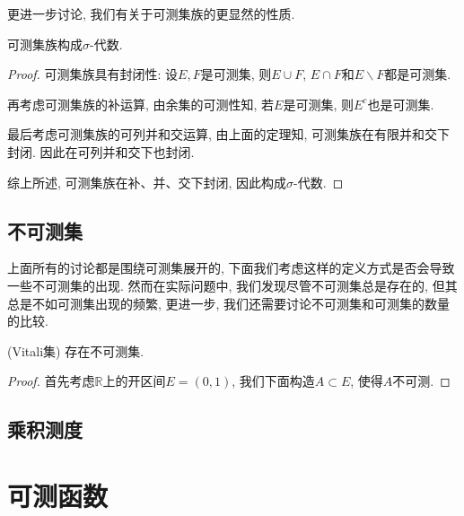 \documentclass[theorem=false,mathfont=none,openany,sub3section]{easybook}
\newcommand{\btocgroup}[1][toc]{\addtocontents{#1}{\string\begingroup}}
\newcommand{\etocgroup}[1][toc]{\addtocontents{#1}{\string\endgroup}}
\begin{document}
更进一步讨论, 我们有关于可测集族的更显然的性质.\par

\begin{theorem}
  可测集族构成$\sigma$-代数.\par
\end{theorem}

\begin{proof}
  可测集族具有封闭性: 设$E,F$是可测集, 则$E\cup F$, $E\cap F$和$E\backslash F$都是可测集.\par
  再考虑可测集族的补运算, 由余集的可测性知, 若$E$是可测集, 则$E^c$也是可测集.\par
  最后考虑可测集族的可列并和交运算, 由上面的定理知, 可测集族在有限并和交下封闭. 因此在可列并和交下也封闭.\par
  综上所述, 可测集族在补、并、交下封闭, 因此构成$\sigma$-代数.\par
\end{proof}

\newpage

\section{不可测集}

上面所有的讨论都是围绕可测集展开的, 下面我们考虑这样的定义方式是否会导致一些不可测集的出现. 然而在实际问题中, 我们发现尽管不可测集总是存在的, 但其总是不如可测集出现的频繁, 更进一步, 我们还需要讨论不可测集和可测集的数量的比较.\par

\begin{theorem}
  (Vitali集) 存在不可测集.\par
\end{theorem}

\begin{proof}
  首先考虑$\mathbb{R}$上的开区间$E=(0,1)$, 我们下面构造$A\subset E$, 使得$A$不可测.\par

\end{proof}

\newpage

\section{乘积测度}

\btocgroup
{}
\chapter{可测函数}
\etocgroup
\end{document}
